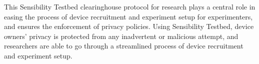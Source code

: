 \smallskip
This Sensibility Testbed clearinghouse protocol for research plays a central role in
easing the process of device recruitment and experiment setup for experimenters, 
and ensures the enforcement of privacy policies. 
%
%
Using Sensibility Testbed, device owners' privacy is protected
from any inadvertent or malicious attempt, and researchers 
are able to go through a streamlined process of device 
recruitment and experiment setup.

